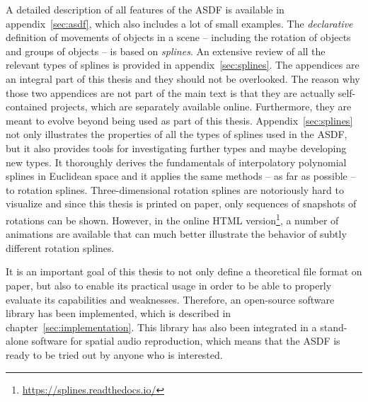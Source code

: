 A detailed description of all features of the ASDF
is available in appendix~\ref{sec:asdf},
which also includes a lot of small examples.
The \emph{declarative}
definition of movements of objects in a scene
-- including the rotation of objects and groups of objects --
is based on \emph{splines}.
An extensive review of all the relevant types of splines
is provided in appendix~\ref{sec:splines}.
The appendices are an integral part of this thesis
and they should not be overlooked.
The reason why those two appendices are not part of the main text
is that they are actually self-contained projects,
which are separately available online.
Furthermore,
they are meant to evolve beyond being used as part of this thesis.
Appendix~\ref{sec:splines} not only illustrates
the properties of all the types of splines used in the ASDF,
but it also provides tools for investigating further types
and maybe developing new types.
It thoroughly derives the fundamentals of interpolatory polynomial splines
in Euclidean space and it applies the same methods
-- as far as possible -- to rotation splines.
Three-dimensional rotation splines are notoriously hard to visualize
and since this thesis is printed on paper,
only sequences of snapshots of rotations can be shown.
However,
in the online
HTML version\footnote{\url{https://splines.readthedocs.io/}},
a number of animations are available that can much better
illustrate the behavior of subtly different rotation splines.

It is an important goal of this thesis
to not only define a theoretical file format on paper,
but also to enable its practical usage
in order to be able to properly evaluate its capabilities and weaknesses.
Therefore, an open-source software library has been implemented,
which is described in chapter~\ref{sec:implementation}.
This library has also been integrated in a stand-alone
software for spatial audio reproduction,
which means that the ASDF is ready to be tried out by anyone who is interested.



